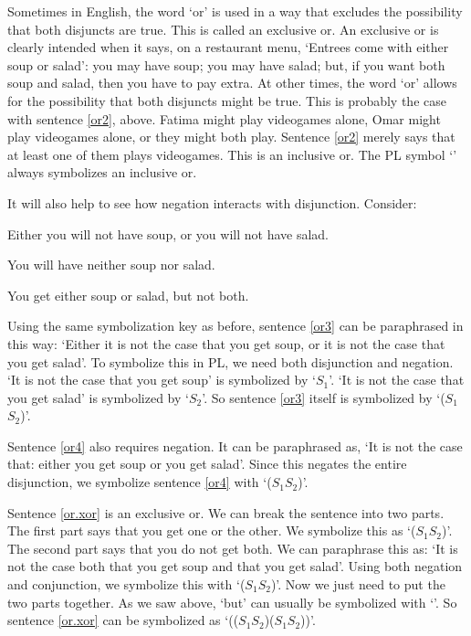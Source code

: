
Sometimes in English, the word ‘or’ is used in a way that excludes the possibility that both disjuncts are true. This is called an exclusive or. An exclusive or is clearly intended when it says, on a restaurant menu, ‘Entrees come with either soup or salad’: you may have soup; you may have salad; but, if you want both soup and salad, then you have to pay extra.
At other times, the word ‘or’ allows for the possibility that both disjuncts might be true. This is probably the case with sentence \ref{or2}, above. Fatima might play videogames alone, Omar might play videogames alone, or they might both play. Sentence \ref{or2} merely says that at least one of them plays videogames. This is an inclusive or. The PL symbol ‘\eor’ always symbolizes an inclusive or.

It will also help to see how negation interacts with disjunction. Consider:
	\begin{earg}
		\item[\ex{or3}] Either you will not have soup, or you will not have salad.
		\item[\ex{or4}] You will have neither soup nor salad.
		\item[\ex{or.xor}] You get either soup or salad, but not both.
	\end{earg}

Using the same symbolization key as before, sentence \ref{or3} can be paraphrased in this way: ‘Either it is not the case that you get soup, or it is not the case that you get salad’. To symbolize this in PL, we need both disjunction and negation. ‘It is not the case that you get soup’ is symbolized by ‘\enot $S_1$’. ‘It is not the case that you get salad’ is symbolized by ‘\enot $S_2$’. So sentence \ref{or3} itself is symbolized by ‘(\enot $S_1$\eor \enot $S_2$)’.

Sentence \ref{or4} also requires negation. It can be paraphrased as, ‘It is not the case that: either you get soup or you get salad’. Since this negates the entire disjunction, we symbolize sentence \ref{or4} with ‘\enot ($S_1$\eor $S_2$)’.

Sentence \ref{or.xor} is an exclusive or. We can break the sentence into two parts. The first part says that you get one or the other. We symbolize this as ‘($S_1$\eor $S_2$)’. The second part says that you do not get both. We can paraphrase this as: ‘It is not the case both that you get soup and that you get salad’. Using both negation and conjunction, we symbolize this with ‘\enot ($S_1$\eand $S_2$)’. Now we just need to put the two parts together. As we saw above, ‘but’ can usually be symbolized with ‘\eand’. So sentence \ref{or.xor} can be symbolized as ‘(($S_1$\eor $S_2$)\eand \enot ($S_1$\eand $S_2$))’.

